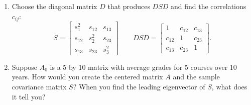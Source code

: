 \documentclass[14pt, a4paper]{article}
\begin{document}
\begin{enumerate}
    \item Choose the diagonal matrix $D$ that produces $DSD$ and find the correlations $c_{ij}$:
          \[
              S = \begin{bmatrix} s_1^2 & s_{12} & s_{13} \\ s_{12} & s_2^2 & s_{23} \\ s_{13} & s_{23} & s_3^2 \end{bmatrix} \qquad DSD = \begin{bmatrix} 1 & c_{12} & c_{13} \\ c_{12} & 1 & c_{23} \\ c_{13} & c_{23} & 1 \end{bmatrix}.
          \]

    \item Suppose $A_0$ is a 5 by 10 matrix with average grades for 5 courses over 10 years. How would you create the centered matrix $A$ and the sample covariance matrix $S$? When you find the leading eigenvector of $S$, what does it tell you?
\end{enumerate}
\end{document}
